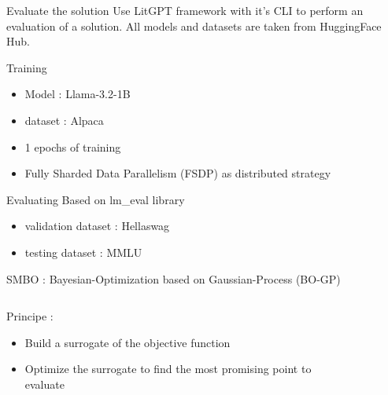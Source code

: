 \begin{frame}{Evaluate the solution}
    Use LitGPT framework with it's CLI to perform an evaluation of a solution. All models and datasets are taken from HuggingFace Hub.
    \begin{block}{Training}
        \begin{itemize}
            \item Model : Llama-3.2-1B
            \item dataset : Alpaca
            \item 1 epochs of training
            \item Fully Sharded Data Parallelism (FSDP) as distributed strategy
        \end{itemize}
    \end{block}

    \begin{block}{Evaluating}
        Based on lm\_eval library
        \begin{itemize}
            \item validation dataset : Hellaswag
            \item testing dataset : MMLU
        \end{itemize}
    \end{block}

    
\end{frame}

\begin{frame}{SMBO : Bayesian-Optimization based on Gaussian-Process (BO-GP)}
    \begin{columns}
        \begin{column}{0.4\textwidth}

            \begin{block}{Principe :}
                \begin{itemize}
                    \item Build a surrogate of the objective function
                    \item Optimize the surrogate to find the most promising point to evaluate
                \end{itemize}
                
            \end{block}
            
        \end{column}        
        \begin{column}{0.5\textwidth}
            \begin{figure}
                \centering
                
            \end{figure}
        \end{column}
    \end{columns}
    
\end{frame}

